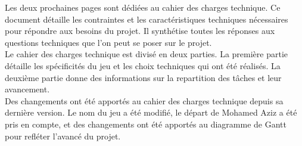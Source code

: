 


Les deux prochaines pages sont dédiées au cahier des charges technique.
Ce document détaille les contraintes et les caractéristiques techniques nécessaires pour répondre aux besoins du projet.
Il synthétise toutes les réponses aux questions techniques que l'on peut se poser sur le projet.
\\

Le cahier des charges technique est divisé en deux parties.
La première partie détaille les spécificités du jeu et les choix techniques qui ont été réalisés. 
La deuxième partie donne des informations sur la repartition des tâches et leur avancement.
\\

Des changements ont été apportés au cahier des charges technique depuis sa dernière version.
Le nom du jeu a été modifié, le départ de Mohamed Aziz a été pris en compte, et des changements ont été apportés au diagramme de Gantt pour refléter l'avancé du projet.




